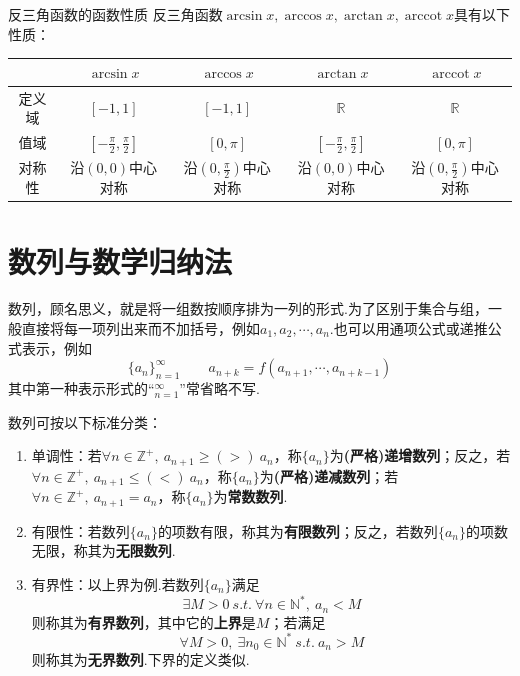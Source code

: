\documentclass[lang=cn, zihao=5]{elegantbook}
\DeclareMathOperator{\arccot}{arccot}
\begin{document}
\begin{proposition}{反三角函数的函数性质}
    反三角函数$\arcsin{x},\arccos{x},\arctan{x},\arccot{x}$具有以下性质：

    \vspace{1em}
    \centering
    \renewcommand\arraystretch{1.2}
    \begin{tabular}{c|c|c|c|c}
        \hline
          & $\arcsin{x}$ & $\arccos{x}$ & $\arctan{x}$ & $\arccot{x}$ \\ \hline
        定义域 & $[-1,1]$ & $[-1,1]$ & $\mathbb{R}$ & $\mathbb{R}$ \\ \hline
        值域 & $[-\frac{\pi}{2} ,\frac{\pi}{2}]$ & $[0,\pi]$ & $[-\frac{\pi}{2},\frac{\pi}{2}]$ & $[0,\pi]$ \\ \hline
        对称性 & 沿$(0,0)$中心对称 & 沿$(0,\frac{\pi}{2})$中心对称 & 沿$(0,0)$中心对称 & 沿$(0,\frac{\pi}{2})$中心对称 \\ \hline
    \end{tabular}
    
\end{proposition}


\chapter{数列与数学归纳法}

数列，顾名思义，就是将一组数按顺序排为一列的形式.为了区别于集合与组，一般直接将每一项列出来而不加括号，例如$a_1,a_2, \cdots ,a_n$.也可以用通项公式或递推公式表示，例如
$$\{ a_n \}_{n=1}^{\infty} \qquad a_{n+k}=f(a_{n+1}, \cdots ,a_{n+k-1})$$
其中第一种表示形式的“$_{n=1}^{\infty}$”常省略不写.

数列可按以下标准分类：
\begin{enumerate}
	\item 单调性：若$\forall n \in \mathbb{Z}^+,~ a_{n+1} \geq (>)~ a_n$，称$\{ a_n \}$为\textbf{(严格)递增数列}；反之，若$\forall n \in \mathbb{Z}^+,~ a_{n+1} \leq (<)~ a_n$，称$\{ a_n \}$为\textbf{(严格)递减数列}；若$\forall n \in \mathbb{Z}^+,~ a_{n+1} = a_n$，称$\{ a_n \}$为\textbf{常数数列}.
	\item 有限性：若数列$\{ a_n \}$的项数有限，称其为\textbf{有限数列}；反之，若数列$\{ a_n \}$的项数无限，称其为\textbf{无限数列}.
	\item 有界性：以上界为例.若数列$\{ a_n \}$满足
	$$\exists M > 0 ~s.t.~ \forall n \in \mathbb{N}^{*},~ a_n<M$$
	则称其为\textbf{有界数列}，其中它的\textbf{上界}是$M$；若满足
	$$\forall M > 0 ,~ \exists n_0 \in \mathbb{N}^{*} ~s.t.~ a_n>M$$
	则称其为\textbf{无界数列}.下界的定义类似.
\end{enumerate}
\end{document}
